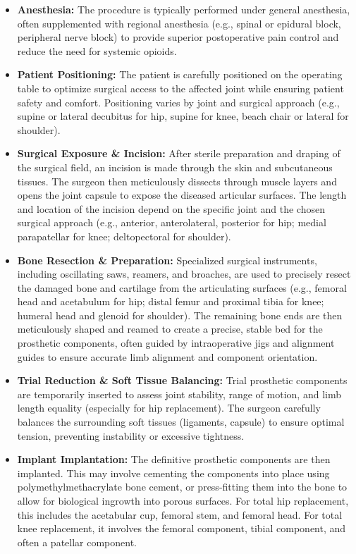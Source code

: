 \begin{itemize}
  \item \textbf{Anesthesia:} The procedure is typically performed under general anesthesia, often supplemented with regional anesthesia (e.g., spinal or epidural block, peripheral nerve block) to provide superior postoperative pain control and reduce the need for systemic opioids.
  \item \textbf{Patient Positioning:} The patient is carefully positioned on the operating table to optimize surgical access to the affected joint while ensuring patient safety and comfort. Positioning varies by joint and surgical approach (e.g., supine or lateral decubitus for hip, supine for knee, beach chair or lateral for shoulder).
  \item \textbf{Surgical Exposure \& Incision:} After sterile preparation and draping of the surgical field, an incision is made through the skin and subcutaneous tissues. The surgeon then meticulously dissects through muscle layers and opens the joint capsule to expose the diseased articular surfaces. The length and location of the incision depend on the specific joint and the chosen surgical approach (e.g., anterior, anterolateral, posterior for hip; medial parapatellar for knee; deltopectoral for shoulder).
  \item \textbf{Bone Resection \& Preparation:} Specialized surgical instruments, including oscillating saws, reamers, and broaches, are used to precisely resect the damaged bone and cartilage from the articulating surfaces (e.g., femoral head and acetabulum for hip; distal femur and proximal tibia for knee; humeral head and glenoid for shoulder). The remaining bone ends are then meticulously shaped and reamed to create a precise, stable bed for the prosthetic components, often guided by intraoperative jigs and alignment guides to ensure accurate limb alignment and component orientation.
  \item \textbf{Trial Reduction \& Soft Tissue Balancing:} Trial prosthetic components are temporarily inserted to assess joint stability, range of motion, and limb length equality (especially for hip replacement). The surgeon carefully balances the surrounding soft tissues (ligaments, capsule) to ensure optimal tension, preventing instability or excessive tightness.
  \item \textbf{Implant Implantation:} The definitive prosthetic components are then implanted. This may involve cementing the components into place using polymethylmethacrylate bone cement, or press-fitting them into the bone to allow for biological ingrowth into porous surfaces. For total hip replacement, this includes the acetabular cup, femoral stem, and femoral head. For total knee replacement, it involves the femoral component, tibial component, and often a patellar component.

\end{itemize}
